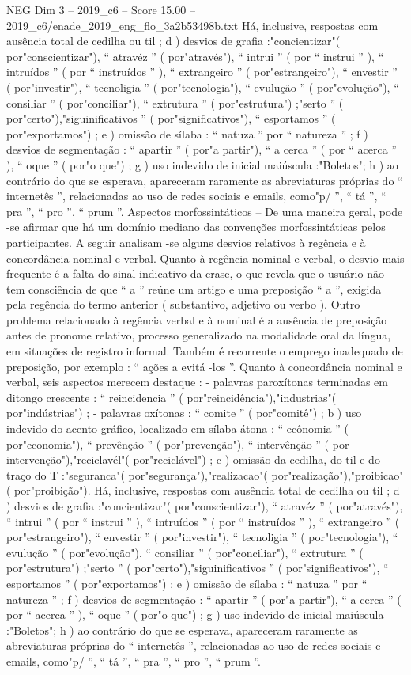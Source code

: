 \begin{textsample}{NEG Dim 3 – 2019\_c6 – Score 15.00 – 2019\_c6/enade\_2019\_eng\_flo\_3a2b53498b.txt}
Há, inclusive, respostas com ausência total de cedilha ou til ; d ) desvios de grafia :"concientizar"( por"conscientizar"), “ atravéz ” ( por"através"), “ intrui ” ( por “ instrui ” ), “ intruídos ” ( por “ instruídos ” ), “ extrangeiro ” ( por"estrangeiro"), “ envestir ” ( por"investir"), “ tecnoligia ” ( por"tecnologia"), “ evulução ” ( por"evolução"), “ consiliar ” ( por"conciliar"), “ extrutura ” ( por"estrutura") ;"serto ” ( por"certo"),"siguinificativos ” ( por"significativos"), “ esportamos ” ( por"exportamos") ; e ) omissão de sílaba : “ natuza ” por “ natureza ” ; f ) desvios de segmentação : “ apartir ” ( por"a partir"), “ a cerca ” ( por “ acerca ” ), “ oque ” ( por"o que") ; g ) uso indevido de inicial maiúscula :"Boletos"; h ) ao contrário do que se esperava, apareceram raramente as abreviaturas próprias do “ internetês ”, relacionadas ao uso de redes sociais e emails, como"p/ ”, “ tá ”, “ pra ”, “ pro ”, “ prum ”.
Aspectos morfossintáticos – De uma maneira geral, pode -se afirmar que há um domínio mediano das convenções morfossintáticas pelos participantes.
A seguir analisam -se alguns desvios relativos à regência e à concordância nominal e verbal.
Quanto à regência nominal e verbal, o desvio mais frequente é a falta do sinal indicativo da crase, o que revela que o usuário não tem consciência de que “ a ” reúne um artigo e uma preposição “ a ”, exigida pela regência do termo anterior ( substantivo, adjetivo ou verbo ).
Outro problema relacionado à regência verbal e à nominal é a ausência de preposição antes de pronome relativo, processo generalizado na modalidade oral da língua, em situações de registro informal.
Também é recorrente o emprego inadequado de preposição, por exemplo : “ ações a evitá -los ”.
Quanto à concordância nominal e verbal, seis aspectos merecem destaque : - palavras paroxítonas terminadas em ditongo crescente : “ reincidencia ” ( por"reincidência"),"industrias"( por"indústrias") ; - palavras oxítonas : “ comite ” ( por"comitê") ; b ) uso indevido do acento gráfico, localizado em sílaba átona : “ ecônomia ” ( por"economia"), “ prevênção ” ( por"prevenção"), “ intervênção ” ( por intervenção"),"reciclavél"( por"reciclável") ; c ) omissão da cedilha, do til e do traço do T :"seguranca"( por"segurança"),"realizacao"( por"realização"),"proibicao"( por"proibição").
Há, inclusive, respostas com ausência total de cedilha ou til ; d ) desvios de grafia :"concientizar"( por"conscientizar"), “ atravéz ” ( por"através"), “ intrui ” ( por “ instrui ” ), “ intruídos ” ( por “ instruídos ” ), “ extrangeiro ” ( por"estrangeiro"), “ envestir ” ( por"investir"), “ tecnoligia ” ( por"tecnologia"), “ evulução ” ( por"evolução"), “ consiliar ” ( por"conciliar"), “ extrutura ” ( por"estrutura") ;"serto ” ( por"certo"),"siguinificativos ” ( por"significativos"), “ esportamos ” ( por"exportamos") ; e ) omissão de sílaba : “ natuza ” por “ natureza ” ; f ) desvios de segmentação : “ apartir ” ( por"a partir"), “ a cerca ” ( por “ acerca ” ), “ oque ” ( por"o que") ; g ) uso indevido de inicial maiúscula :"Boletos"; h ) ao contrário do que se esperava, apareceram raramente as abreviaturas próprias do “ internetês ”, relacionadas ao uso de redes sociais e emails, como"p/ ”, “ tá ”, “ pra ”, “ pro ”, “ prum ”.

\end{textsample}
